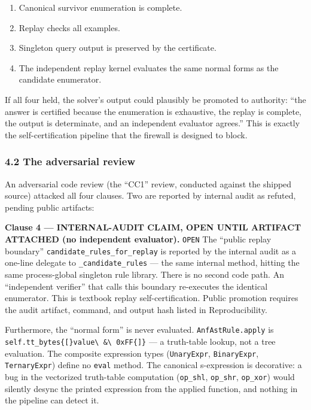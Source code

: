 \documentclass[
  10pt,
]{article}
\providecommand{\tightlist}{%
  \setlength{\itemsep}{0pt}\setlength{\parskip}{0pt}}
\providecommand{\tightlist}{%
  \setlength{\itemsep}{0pt}\setlength{\parskip}{0pt}}
\DeclareRobustCommand{\texttt}[1]{{\paperSymbolFont\nolinkurl{#1}}}
\begin{document}
\begin{enumerate}
\def\labelenumi{\arabic{enumi}.}
\tightlist
\item
  Canonical survivor enumeration is complete.
\item
  Replay checks all examples.
\item
  Singleton query output is preserved by the certificate.
\item
  The independent replay kernel evaluates the same normal forms as the candidate enumerator.
\end{enumerate}

If all four held, the solver's output could plausibly be promoted to authority: ``the answer is certified because the enumeration is exhaustive, the replay is complete, the output is determinate, and an independent evaluator agrees.'' This is exactly the self-certification pipeline that the firewall is designed to block.

\subsubsection{4.2 The adversarial review}\label{the-adversarial-review}

An adversarial code review (the ``CC1'' review, conducted against the shipped source) attacked all four clauses. Two are reported by internal audit as refuted, pending public artifacts:

\textbf{Clause 4 --- INTERNAL-AUDIT CLAIM, OPEN UNTIL ARTIFACT ATTACHED (no independent evaluator).} \texttt{OPEN} The ``public replay boundary'' \texttt{candidate\_rules\_for\_replay} is reported by the internal audit as a one-line delegate to \texttt{\_candidate\_rules} --- the same internal method, hitting the same process-global singleton rule library. There is no second code path. An ``independent verifier'' that calls this boundary re-executes the identical enumerator. This is textbook replay self-certification. Public promotion requires the audit artifact, command, and output hash listed in Reproducibility.

Furthermore, the ``normal form'' is never evaluated. \texttt{AnfAstRule.apply} is \texttt{self.tt\_bytes{[}value\ \&\ 0xFF{]}} --- a truth-table lookup, not a tree evaluation. The composite expression types (\texttt{UnaryExpr}, \texttt{BinaryExpr}, \texttt{TernaryExpr}) define no \texttt{eval} method. The canonical s-expression is decorative: a bug in the vectorized truth-table computation (\texttt{op\_shl}, \texttt{op\_shr}, \texttt{op\_xor}) would silently desync the printed expression from the applied function, and nothing in the pipeline can detect it.
\end{document}
